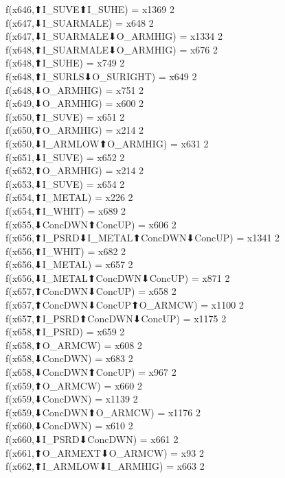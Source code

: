 f(x646,⬆I_SUVE⬆I_SUHE) = x1369 {2} \\
f(x647,⬇I_SUARMALE) = x648 {2} \\
f(x647,⬇I_SUARMALE⬇O_ARMHIG) = x1334 {2} \\
f(x648,⬆I_SUARMALE⬇O_ARMHIG) = x676 {2} \\
f(x648,⬆I_SUHE) = x749 {2} \\
f(x648,⬆I_SURLS⬇O_SURIGHT) = x649 {2} \\
f(x648,⬇O_ARMHIG) = x751 {2} \\
f(x649,⬇O_ARMHIG) = x600 {2} \\
f(x650,⬆I_SUVE) = x651 {2} \\
f(x650,⬆O_ARMHIG) = x214 {2} \\
f(x650,⬇I_ARMLOW⬆O_ARMHIG) = x631 {2} \\
f(x651,⬇I_SUVE) = x652 {2} \\
f(x652,⬆O_ARMHIG) = x214 {2} \\
f(x653,⬇I_SUVE) = x654 {2} \\
f(x654,⬆I_METAL) = x226 {2} \\
f(x654,⬆I_WHIT) = x689 {2} \\
f(x655,⬇ConcDWN⬆ConcUP) = x606 {2} \\
f(x656,⬆I_PSRD⬇I_METAL⬆ConcDWN⬇ConcUP) = x1341 {2} \\
f(x656,⬆I_WHIT) = x682 {2} \\
f(x656,⬇I_METAL) = x657 {2} \\
f(x656,⬇I_METAL⬆ConcDWN⬇ConcUP) = x871 {2} \\
f(x657,⬆ConcDWN⬇ConcUP) = x658 {2} \\
f(x657,⬆ConcDWN⬇ConcUP⬆O_ARMCW) = x1100 {2} \\
f(x657,⬆I_PSRD⬆ConcDWN⬇ConcUP) = x1175 {2} \\
f(x658,⬆I_PSRD) = x659 {2} \\
f(x658,⬆O_ARMCW) = x608 {2} \\
f(x658,⬇ConcDWN) = x683 {2} \\
f(x658,⬇ConcDWN⬆ConcUP) = x967 {2} \\
f(x659,⬆O_ARMCW) = x660 {2} \\
f(x659,⬇ConcDWN) = x1139 {2} \\
f(x659,⬇ConcDWN⬆O_ARMCW) = x1176 {2} \\
f(x660,⬇ConcDWN) = x610 {2} \\
f(x660,⬇I_PSRD⬇ConcDWN) = x661 {2} \\
f(x661,⬆O_ARMEXT⬇O_ARMCW) = x93 {2} \\
f(x662,⬆I_ARMLOW⬇I_ARMHIG) = x663 {2} \\
